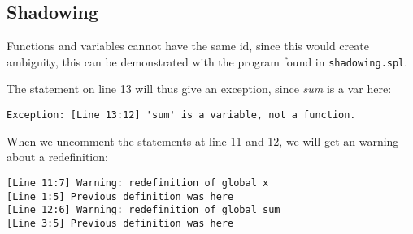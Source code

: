 \documentclass[a4paper]{article}
\begin{document}
\subsection{Shadowing}
Functions and variables cannot have the same id, since this would create ambiguity, this can be demonstrated with the program found in {\tt shadowing.spl}.

The statement on line 13 will thus give an exception, since \emph{sum} is a var here: 
\begin{verbatim}
Exception: [Line 13:12] 'sum' is a variable, not a function.
\end{verbatim}

When we uncomment the statements at line 11 and 12, we will get an warning about a redefinition:
\begin{verbatim}
[Line 11:7] Warning: redefinition of global x
[Line 1:5] Previous definition was here
[Line 12:6] Warning: redefinition of global sum
[Line 3:5] Previous definition was here
\end{verbatim}
\end{document}
